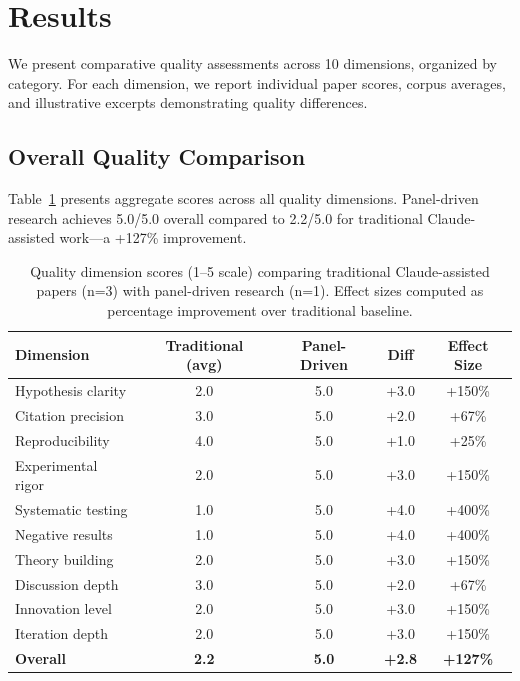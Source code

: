 \section{Results}
\label{sec:results}

We present comparative quality assessments across 10 dimensions, organized by category. For each dimension, we report individual paper scores, corpus averages, and illustrative excerpts demonstrating quality differences.

\subsection{Overall Quality Comparison}

Table~\ref{tab:overall} presents aggregate scores across all quality dimensions. Panel-driven research achieves 5.0/5.0 overall compared to 2.2/5.0 for traditional Claude-assisted work---a +127\% improvement.

\begin{table}[h]
\centering
\small
\begin{tabular}{lcccc}
\toprule
\textbf{Dimension} & \textbf{Traditional (avg)} & \textbf{Panel-Driven} & \textbf{Diff} & \textbf{Effect Size} \\
\midrule
Hypothesis clarity & 2.0 & 5.0 & +3.0 & +150\% \\
Citation precision & 3.0 & 5.0 & +2.0 & +67\% \\
Reproducibility & 4.0 & 5.0 & +1.0 & +25\% \\
\midrule
Experimental rigor & 2.0 & 5.0 & +3.0 & +150\% \\
Systematic testing & 1.0 & 5.0 & +4.0 & +400\% \\
\midrule
Negative results & 1.0 & 5.0 & +4.0 & +400\% \\
Theory building & 2.0 & 5.0 & +3.0 & +150\% \\
Discussion depth & 3.0 & 5.0 & +2.0 & +67\% \\
\midrule
Innovation level & 2.0 & 5.0 & +3.0 & +150\% \\
Iteration depth & 2.0 & 5.0 & +3.0 & +150\% \\
\midrule
\textbf{Overall} & \textbf{2.2} & \textbf{5.0} & \textbf{+2.8} & \textbf{+127\%} \\
\bottomrule
\end{tabular}
\caption{Quality dimension scores (1--5 scale) comparing traditional Claude-assisted papers (n=3) with panel-driven research (n=1). Effect sizes computed as percentage improvement over traditional baseline.}
\label{tab:overall}
\end{table}

